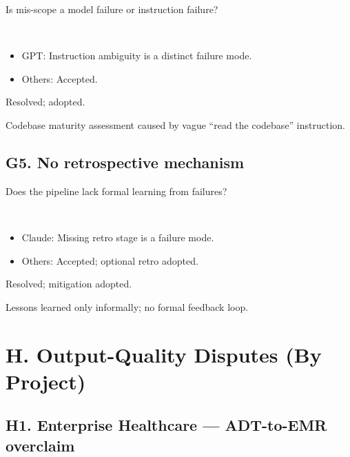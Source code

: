 \documentclass[11pt,letterpaper]{article}
\begin{document}
\begin{reflist}
\item[Dispute:] Is mis-scope a model failure or instruction failure?
\item[Positions:]~
  \begin{itemize}[nosep]
    \item GPT: Instruction ambiguity is a distinct failure mode.
    \item Others: Accepted.
  \end{itemize}
\item[Status:] Resolved; adopted.
\item[Evidence:] Codebase maturity assessment caused by vague ``read the codebase'' instruction.
\end{reflist}

\subsection{G5. No retrospective mechanism}

\begin{reflist}
\item[Dispute:] Does the pipeline lack formal learning from failures?
\item[Positions:]~
  \begin{itemize}[nosep]
    \item Claude: Missing retro stage is a failure mode.
    \item Others: Accepted; optional retro adopted.
  \end{itemize}
\item[Status:] Resolved; mitigation adopted.
\item[Evidence:] Lessons learned only informally; no formal feedback loop.
\end{reflist}

\section{H. Output-Quality Disputes (By Project)}

\subsection{H1. Enterprise Healthcare --- ADT-to-EMR overclaim}
\end{document}
